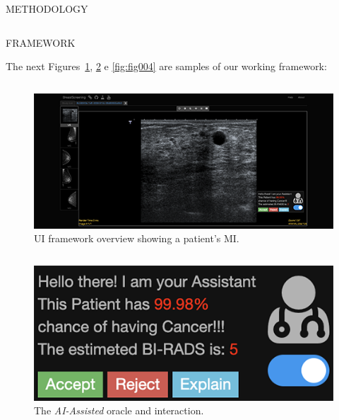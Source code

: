 \documentclass[final]{beamer}
\begin{document}
\begin{frame}[t, fragile = singleslide]{}
\begin{columns}[t]
\begin{column}{0.45\textwidth}
\begin{block}{METHODOLOGY}
\hfill

\end{block}

\end{column}

\end{columns}

\begin{columns}[t]

\begin{column}{0.945\textwidth}

\begin{block}{FRAMEWORK}

The next Figures~\ref{fig:fig002}, \ref{fig:fig003} e \ref{fig:fig004} are samples of our working framework:

\begin{column}[T]{0.33\textwidth}
\begin{figure}[!htb]
\centering
\caption{UI framework overview showing a patient's MI.}
\label{fig:fig002}
\includegraphics[width = 0.75\columnwidth]{./figures/fig002}
\end{figure}
\end{column}
{\color{PosterBars}\vrule width 1.5pt}
\begin{column}[T]{0.33\textwidth}
\begin{figure}[!htb]
\centering
\caption{The {\it AI-Assisted} oracle and interaction.}
\label{fig:fig003}
\includegraphics[width = 0.75\columnwidth]{./figures/fig003}
\end{figure}
\end{column}
{\color{PosterBars}\vrule width 1.5pt}
\begin{column}[T]{0.33\textwidth}

\end{column}
\end{block}
\end{column}
\end{columns}
\end{frame}
\end{document}
